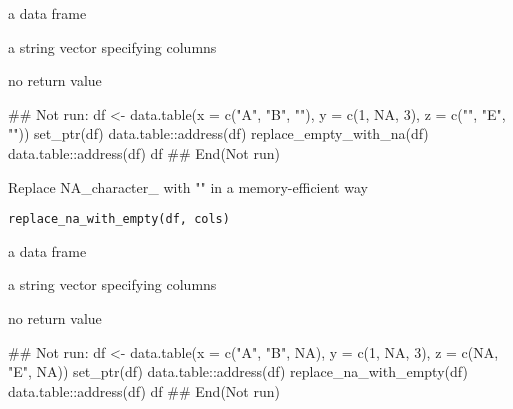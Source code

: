 \documentclass[letterpaper]{book}
\begin{document}
%
\begin{Arguments}
\begin{ldescription}
\item[\code{df}] a data frame

\item[\code{cols}] a string vector specifying columns
\end{ldescription}
\end{Arguments}
%
\begin{Value}
no return value
\end{Value}
%
\begin{Examples}
\begin{ExampleCode}
## Not run: 
df <- data.table(x = c("A", "B", ""), y = c(1, NA, 3), z = c("", "E", ""))
set_ptr(df)
data.table::address(df)
replace_empty_with_na(df)
data.table::address(df)
df
## End(Not run)

\end{ExampleCode}
\end{Examples}
%
\begin{Description}
Replace NA\_character\_ with "" in a memory-efficient way
\end{Description}
%
\begin{Usage}
\begin{verbatim}
replace_na_with_empty(df, cols)
\end{verbatim}
\end{Usage}
%
\begin{Arguments}
\begin{ldescription}
\item[\code{df}] a data frame

\item[\code{cols}] a string vector specifying columns
\end{ldescription}
\end{Arguments}
%
\begin{Value}
no return value
\end{Value}
%
\begin{Examples}
\begin{ExampleCode}
## Not run: 
df <- data.table(x = c("A", "B", NA), y = c(1, NA, 3), z = c(NA, "E", NA))
set_ptr(df)
data.table::address(df)
replace_na_with_empty(df)
data.table::address(df)
df
## End(Not run)

\end{ExampleCode}
\end{Examples}
\end{document}
